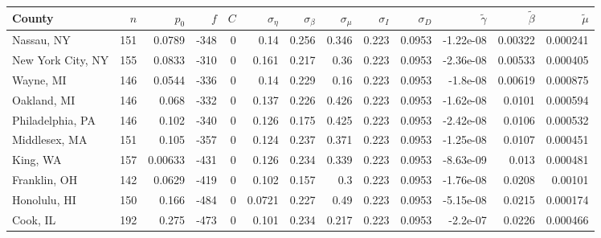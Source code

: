 \documentclass[12pt,letterpaper]{article}
\begin{document}
\begin{appendices}
\begin{sidewaystable}
{\begin{tabular}{lrrrrrrrrrrrr}
\hline
 County             &   $n$ &   $p_0$ &    $f$ &   $C$ &   $\sigma_\eta$ &   $\sigma_\beta$ &   $\sigma_\mu$ &   $\sigma_I$ &   $\sigma_D$ &   $\tilde\gamma$ &   $\tilde{\beta}$ &   $\tilde{\mu}$ \\
\hline
 Nassau, NY         & 151   & 0.0789  & -348   &     0 &          0.14   &            0.256 &         0.346  &        0.223 &       0.0953 &        -1.22e-08 &           0.00322 &        0.000241 \\
 New York City, NY  & 155   & 0.0833  & -310   &     0 &          0.161  &            0.217 &         0.36   &        0.223 &       0.0953 &        -2.36e-08 &           0.00533 &        0.000405 \\
 Wayne, MI          & 146   & 0.0544  & -336   &     0 &          0.14   &            0.229 &         0.16   &        0.223 &       0.0953 &        -1.8e-08  &           0.00619 &        0.000875 \\
 Oakland, MI        & 146   & 0.068   & -332   &     0 &          0.137  &            0.226 &         0.426  &        0.223 &       0.0953 &        -1.62e-08 &           0.0101  &        0.000594 \\
 Philadelphia, PA   & 146   & 0.102   & -340   &     0 &          0.126  &            0.175 &         0.425  &        0.223 &       0.0953 &        -2.42e-08 &           0.0106  &        0.000532 \\
 Middlesex, MA      & 151   & 0.105   & -357   &     0 &          0.124  &            0.237 &         0.371  &        0.223 &       0.0953 &        -1.25e-08 &           0.0107  &        0.000451 \\
 King, WA           & 157   & 0.00633 & -431   &     0 &          0.126  &            0.234 &         0.339  &        0.223 &       0.0953 &        -8.63e-09 &           0.013   &        0.000481 \\
 Franklin, OH       & 142   & 0.0629  & -419   &     0 &          0.102  &            0.157 &         0.3    &        0.223 &       0.0953 &        -1.76e-08 &           0.0208  &        0.00101  \\
 Honolulu, HI       & 150   & 0.166   & -484   &     0 &          0.0721 &            0.227 &         0.49   &        0.223 &       0.0953 &        -5.15e-08 &           0.0215  &        0.000174 \\
 Cook, IL           & 192   & 0.275   & -473   &     0 &          0.101  &            0.234 &         0.217  &        0.223 &       0.0953 &        -2.2e-07  &           0.0226  &        0.000466 \\

\end{tabular}}
\end{sidewaystable}
\end{appendices}
\end{document}
